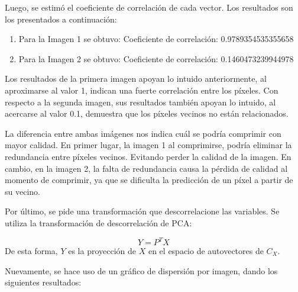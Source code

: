 \documentclass[a4paper,12pt]{article}
\begin{document}
Luego, se estimó el coeficiente de correlación de cada vector. Los resultados son los presentados a continuación:
\begin{enumerate}
    \item Para la Imagen 1 se obtuvo: 
    Coeficiente de correlación: 0.9789354535355658

    \item Para la Imagen 2 se obtuvo: 
    Coeficiente de correlación: 0.1460473239944978
\end{enumerate}

Los resultados de la primera imagen apoyan lo intuido anteriormente, al aproximarse al valor 1, indican una fuerte correlación entre los píxeles.
Con respecto a la segunda imagen, sus resultados también apoyan lo intuido, al acercarse al valor 0.1, demuestra que los píxeles vecinos no están relacionados.

\vspace{1em}

La diferencia entre ambas imágenes nos indica cuál se podría comprimir con mayor calidad. En primer lugar, la imagen 1 al comprimirse, podría eliminar la redundancia entre píxeles vecinos.
Evitando perder la calidad de la imagen. En cambio, en la imagen 2, la falta de redundancia causa la pérdida de calidad al momento de comprimir, ya que se dificulta la predicción de un píxel a partir de su vecino. 

\vspace{1em}

Por último, se pide una transformación que descorrelacione las variables.
Se utiliza la transformación de descorrelación de PCA:

\vspace{1em}

\[
Y = P^T X
\]
De esta forma, \(Y\) es la proyección de \(X\) en el espacio de autovectores de \(C_X\).

Nuevamente, se hace uso de un gráfico de dispersión por imagen, dando los siguientes resultados:
\end{document}
